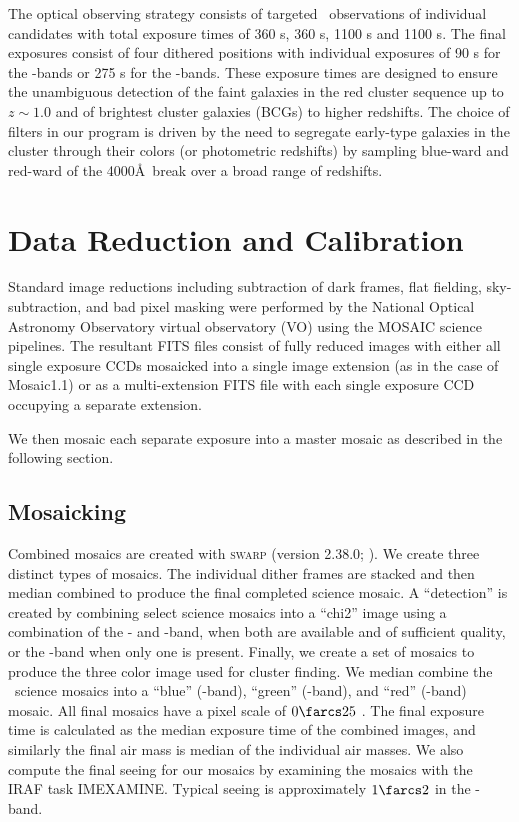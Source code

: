 \documentclass[apj, revtex4-1]{emulateapj}
\begin{document}
The optical observing strategy consists of targeted \sdssg\sdssr\sdssi\sdssz\ observations of individual candidates with total exposure times of 360 s, 360 s, 1100 s and 1100 s. The final exposures consist of four dithered positions with individual exposures of 90 s for the \sdssg\sdssr-bands or 275 s for the \sdssi\sdssz-bands. These exposure times are designed to ensure the unambiguous detection of the faint galaxies in the red cluster sequence up to $z \sim 1.0$ and of brightest cluster galaxies (BCGs) to higher redshifts. The choice of filters in our program is driven by the need to segregate early-type galaxies in the cluster through their colors (or photometric redshifts) by sampling blue-ward and red-ward of the 4000\AA\ break over a broad range of redshifts.

\section{Data Reduction and Calibration}\label{sec:data reduction}
Standard image reductions including subtraction of dark frames, flat fielding, sky-subtraction, and bad pixel masking were performed by the National Optical Astronomy Observatory virtual observatory (VO) using the MOSAIC \citep{Valdes2007} science pipelines. The resultant FITS files consist of fully reduced images with either all single exposure CCDs mosaicked into a single image extension (as in the case of Mosaic1.1) or as a multi-extension FITS file with each single exposure CCD occupying a separate extension.

We then mosaic each separate exposure into a master mosaic as described in the following section.

\subsection{Mosaicking}\label{sec:mosaicks}
Combined mosaics are created with \textsc{swarp} (version 2.38.0; \citealt{Bertin2002}). We create three distinct types of mosaics. The individual dither frames are stacked and then median combined to produce the final completed science mosaic. A ``detection'' is created by combining select science mosaics into a ``chi2'' image using a combination of the \sdssi- and \sdssz-band, when both are available and of sufficient quality, or the \sdssi-band when only one is present. Finally, we create a set of mosaics to produce the three color image used for cluster finding. We median combine the \sdssg\sdssr\sdssi\sdssz\ science mosaics into a ``blue'' (\sdssg-band), ``green'' (\sdssr-band), and ``red'' (\sdssi\sdssz-band) mosaic. All final mosaics have a pixel scale of $0\farcs25$ \perpixel. The final exposure time is calculated as the median exposure time of the combined images, and similarly the final air mass is median of the individual air masses. We also compute the final seeing for our mosaics by examining the mosaics with the IRAF \citep{Tody1993} task IMEXAMINE. Typical seeing is approximately $1\farcs2$ in the \sdssi-band.
\end{document}
